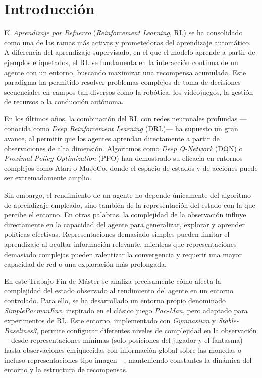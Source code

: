 \chapter{Introducción}

El \textit{Aprendizaje por Refuerzo} (\textit{Reinforcement Learning}, RL) se ha consolidado como una de las ramas más activas y prometedoras del aprendizaje automático. A diferencia del aprendizaje supervisado, en el que el modelo aprende a partir de ejemplos etiquetados, el RL se fundamenta en la interacción continua de un agente con un entorno, buscando maximizar una recompensa acumulada. Este paradigma ha permitido resolver problemas complejos de toma de decisiones secuenciales en campos tan diversos como la robótica, los videojuegos, la gestión de recursos o la conducción autónoma.

En los últimos años, la combinación del RL con redes neuronales profundas —conocida como \textit{Deep Reinforcement Learning} (DRL)— ha supuesto un gran avance, al permitir que los agentes aprendan directamente a partir de observaciones de alta dimensión. Algoritmos como \textit{Deep Q-Network} (DQN) o \textit{Proximal Policy Optimization} (PPO) han demostrado su eficacia en entornos complejos como Atari o MuJoCo, donde el espacio de estados y de acciones puede ser extremadamente amplio.

Sin embargo, el rendimiento de un agente no depende únicamente del algoritmo de aprendizaje empleado, sino también de la representación del estado con la que percibe el entorno. En otras palabras, la complejidad de la observación influye directamente en la capacidad del agente para generalizar, explorar y aprender políticas efectivas. Representaciones demasiado simples pueden limitar el aprendizaje al ocultar información relevante, mientras que representaciones demasiado complejas pueden ralentizar la convergencia y requerir una mayor capacidad de red o una exploración más prolongada.

En este Trabajo Fin de Máster se analiza precisamente cómo afecta la complejidad del estado observado al rendimiento del agente en un entorno controlado. Para ello, se ha desarrollado un entorno propio denominado \textit{SimplePacmanEnv}, inspirado en el clásico juego \textit{Pac-Man}, pero adaptado para experimentos de RL. Este entorno, implementado con \textit{Gymnasium} y \textit{Stable-Baselines3}, permite configurar diferentes niveles de complejidad en la observación —desde representaciones mínimas (solo posiciones del jugador y el fantasma) hasta observaciones enriquecidas con información global sobre las monedas o incluso representaciones tipo imagen—, manteniendo constantes la dinámica del entorno y la estructura de recompensas.

